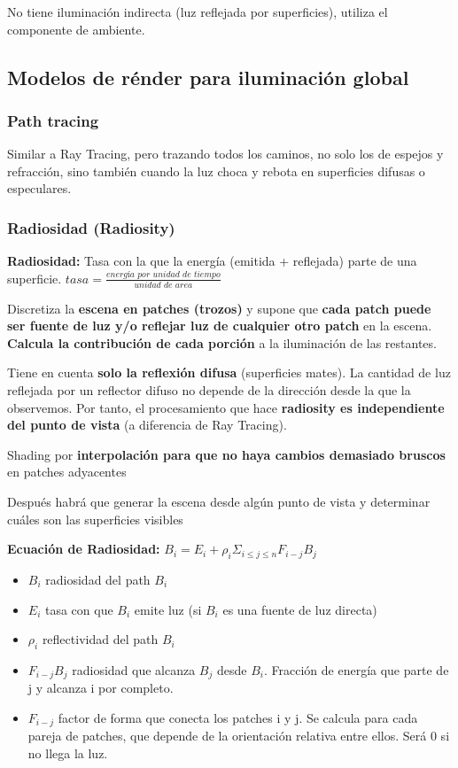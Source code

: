 No tiene iluminación indirecta (luz reflejada por superficies), utiliza el componente de ambiente.

\subsection{Modelos de rénder para iluminación global}
\subsubsection{Path tracing}
Similar a Ray Tracing, pero trazando todos los caminos, no solo los de espejos y refracción, sino también cuando la luz choca y rebota en superficies difusas o especulares.

\subsubsection{Radiosidad (Radiosity)}
\textbf{Radiosidad:} Tasa con la que la energía (emitida + reflejada) parte de una superficie. $\textit{tasa}= \frac{\textit{energía por unidad de tiempo}}{\textit{unidad de area}}$

Discretiza la \textbf{escena en patches (trozos)} y supone que \textbf{cada patch puede ser fuente de luz y/o reflejar luz de cualquier otro patch} en la escena. \textbf{Calcula la contribución de cada porción} a la iluminación de las restantes.

Tiene en cuenta \textbf{solo la reflexión difusa} (superficies mates). La cantidad de luz reflejada por un reflector difuso no depende de la dirección desde la que la observemos. Por tanto, el procesamiento que hace \textbf{radiosity es independiente del punto de vista} (a diferencia de Ray Tracing).

Shading por \textbf{interpolación para que no haya cambios demasiado bruscos} en patches adyacentes

Después habrá que generar la escena desde algún punto de vista y determinar cuáles son las superficies visibles

\textbf{Ecuación de Radiosidad:} $B_i = E_i + \rho_i \Sigma_{i \leq j \leq n} F_{i-j} B_j $
\begin{itemize}
    \item $B_i$ radiosidad del path $B_i$
    \item $E_i$ tasa con que $B_i$ emite luz (si $B_i$ es una fuente de luz directa)
    \item $\rho_i$ reflectividad del path $B_i$
    \item $F_{i-j} B_j$ radiosidad que alcanza $B_j$ desde $B_i$. Fracción de energía que parte de j y alcanza i por completo.
    \item $F_{i-j}$ factor de forma que conecta los patches i y j. Se calcula para cada pareja de patches, que depende de la orientación relativa entre ellos. Será 0 si no llega la luz.
\end{itemize}

